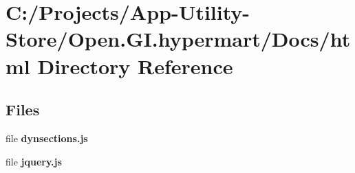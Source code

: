 \section{C\+:/\+Projects/\+App-\/\+Utility-\/\+Store/\+Open.G\+I.\+hypermart/\+Docs/html Directory Reference}
\label{dir_80fdbfb26458bfc8fe0b72e52c71afdb}
\subsection*{Files}
\begin{DoxyCompactItemize}
\item 
file \textbf{ dynsections.\+js}
\item 
file \textbf{ jquery.\+js}
\end{DoxyCompactItemize}
